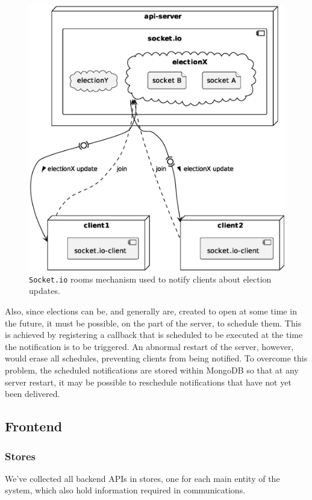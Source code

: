 \documentclass{scrartcl}
\begin{document}
\begin{figure}
    \centering
    \includegraphics[width=0.7\linewidth]{figures/socket-io-rooms.eps}
    \caption{\texttt{Socket.io} rooms mechanism used to notify clients about election updates.}
    \label{fig:socket-io-rooms} 
\end{figure}

Also, since elections can be, and generally are, created to open at some time in the future, it must be possible, on the part of the server, to schedule them. 
%
This is achieved by registering a callback that is scheduled to be executed at the time the notification is to be triggered. 
%
An abnormal restart of the server, however, would erase all schedules, preventing clients from being notified. 
%
To overcome this problem, the scheduled notifications are stored within MongoDB so that at any server restart, it may be possible to reschedule notifications that have not yet been delivered.



\subsection{Frontend}

\subsubsection{Stores}

We've collected all backend APIs in stores, one for each main entity of the system, which also hold information required in communications.
\end{document}
